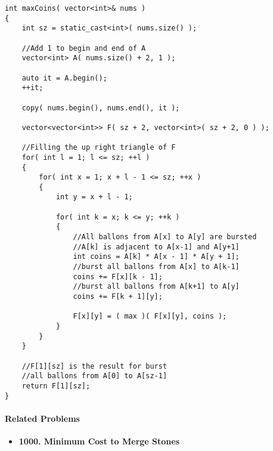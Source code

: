 \begin{lstlisting}[style=customc, caption={Dynamic Programming}]
int maxCoins( vector<int>& nums )
{
    int sz = static_cast<int>( nums.size() );

    //Add 1 to begin and end of A
    vector<int> A( nums.size() + 2, 1 );

    auto it = A.begin();
    ++it;

    copy( nums.begin(), nums.end(), it );

    vector<vector<int>> F( sz + 2, vector<int>( sz + 2, 0 ) );

    //Filling the up right triangle of F
    for( int l = 1; l <= sz; ++l )
    {
        for( int x = 1; x + l - 1 <= sz; ++x )
        {
            int y = x + l - 1;

            for( int k = x; k <= y; ++k )
            {
                //All ballons from A[x] to A[y] are bursted
                //A[k] is adjacent to A[x-1] and A[y+1]
                int coins = A[k] * A[x - 1] * A[y + 1];
                //burst all ballons from A[x] to A[k-1]
                coins += F[x][k - 1];
                //burst all ballons from A[k+1] to A[y]
                coins += F[k + 1][y];

                F[x][y] = ( max )( F[x][y], coins );
            }
        }
    }

    //F[1][sz] is the result for burst
    //all ballons from A[0] to A[sz-1]
    return F[1][sz];
}

\end{lstlisting}

\paragraph{Related Problems}
\begin{itemize}
\item \textbf{1000. Minimum Cost to Merge Stones}
\end{itemize}